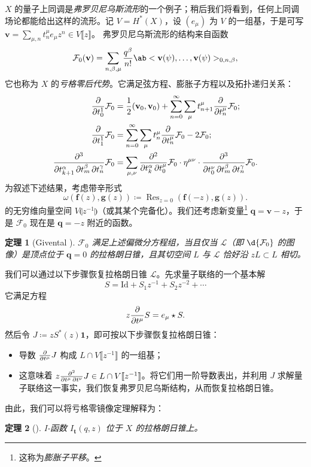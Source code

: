 \documentclass{amsart}
\newtheorem{thm}{定理}[section]
\theoremstyle{definition}
\theoremstyle{remark}
\theoremstyle{plain}
\theoremstyle{definition}
\theoremstyle{remark}
\newcommand{\mc}[1]{\mathcal{#1}}
\newcommand{\mbf}[1]{\mathbf{#1}}
\newcommand{\bv}{\mbf{v}}
\newcommand{\bq}{\mbf{q}}
\newcommand{\mr}[1]{\mathrm{#1}}
\newcommand{\on}[1]{\operatorname{#1}}
\newcommand{\1}{\mathbf{1}}
\newcommand{\2}{\mathbf{2}}
\newcommand{\3}{\mathbf{3}}
\newcommand{\ps}[1]{\llbracket #1 \rrbracket}
\newcommand{\ls}[1]{\llparenthesis #1 \rrparenthesis}
\begin{document}
\(X\) 的量子上同调是\textit{弗罗贝尼乌斯流形}的一个例子；稍后我们将看到，任何上同调场论都能给出这样的流形。记 \(V = H^*(X)\)，设 \((e_{\mu})\) 为 \(V\) 的一组基，于是可写 $\bv = \sum_{\mu,n} t^{\mu}_n e_{\mu} z^n \in V\ps{z}$。
弗罗贝尼乌斯流形的结构来自函数
\[
    \mc{F}_0(\bv) = \sum_{n, \beta, \mu} \frac{q^{\beta}}{n!} \ab<\bv(\psi), \ldots, \bv(\psi)>_{0,n,\beta},
\]
它也称为 \(X\) 的\textit{亏格零后代势}。它满足弦方程、膨胀子方程以及拓扑递归关系：
\begin{align*}
    \pdv{}{t_0^1} \mc{F}_0 &= \frac{1}{2} (\bv_0, \bv_0) + \sum_{n=0}^{\infty} \sum_{\mu} t_{n+1}^{\mu} \pdv{}{t_n^{\mu}} \mc{F}_0; \\
    \pdv{}{t_1^1} \mc{F}_0 &= \sum_{n=0}^{\infty} \sum_{\mu} t_n^{\mu} \pdv{}{t_n^{\mu}}\mc{F}_0 - 2 \mc{F}_0; \\
    \pdv{}{t_{k+1}^{\alpha},t_m^{\beta},t_n^{\gamma}} \mc{F}_0 &= \sum_{\mu,\nu} \pdv{}{t_k^{\alpha},t_0^{\mu}} \mc{F}_0 \cdot \eta^{\mu\nu} \cdot \pdv{}{t_0^{\nu},t_{m}^{\beta},t_n^{\gamma}} \mc{F}_0.
\end{align*}
为叙述下述结果，考虑带辛形式
\[ \omega(\mbf{f}(z), \mbf{g}(z)) \coloneqq \on{Res}_{z=0}(\mbf{f}(-z), \mbf{g}(z)). \]
的无穷维向量空间 $V\ls{z^{-1}}$（或其某个完备化）。我们还考虑新变量\footnote{这称为\textit{膨胀子平移}。} $\bq = \bv - z$，于是 $\mc{F}_0$ 现在是 $\bq = -z$ 附近的函数。

\begin{thm}[Givental {\cite{Givental2004}}]
    $\mc{F}_0$ 满足上述偏微分方程组，当且仅当 $\mc{L}$（即 $\d{\mc{F}_0}$ 的图像）是顶点位于 $\bq = 0$ 的拉格朗日锥，且其切空间 $L$ 与 $\mc{L}$ 恰好沿 $zL \subset L$ 相切。
\end{thm}

我们可以通过以下步骤恢复拉格朗日锥 $\mc{L}$。先求量子联络的一个基本解
\[ S = \mr{Id} + S_1 z^{-1} + S_2 z^{-2} + \cdots \]
它满足方程
\[ z \pdv{}{t^{\mu}}S = e_{\mu} \star S. \]
然后令 $J \coloneqq z S^*(z) \1$，即可按以下步骤恢复拉格朗日锥：
\begin{itemize}
    \item 导数 $\pdv{}{t^{\mu}} J$ 构成 $L \cap V\ps{z^{-1}}$ 的一组基；
    \item 这意味着 $z \pdv{}{t^{\mu},t^{\nu}} J \in L \cap V \ps{z^{-1}}$。将它们用一阶导数表出，并利用 $J$ 求解量子联络这一事实，我们恢复弗罗贝尼乌斯结构，从而恢复拉格朗日锥。
\end{itemize}

由此，我们可以将亏格零镜像定理解释为：
\begin{thm}[{\cite{Givental1998}}]
    I-函数 \(I_{\mbf{t}}(q,z)\) 位于 \(X\) 的拉格朗日锥上。
\end{thm}
\end{document}
